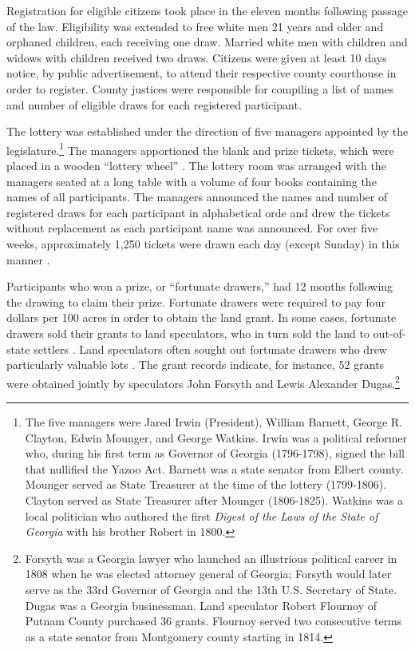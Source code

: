 Registration for eligible citizens took place in the eleven months following passage of the law. Eligibility was extended to free white men 21 years and older and orphaned children, each receiving one draw. Married white men with children and widows with children received two draws. Citizens were given at least 10 days notice, by public advertisement, to attend their respective county courthouse in order to register. County justices were responsible for compiling a list of names and number of eligible draws for each registered participant.

The lottery was established under the direction of five managers appointed by the legislature.\footnote{The five managers were Jared Irwin (President), William Barnett, George R. Clayton, Edwin Mounger, and George Watkins. Irwin was a political reformer who, during his first term as Governor of Georgia (1796-1798), signed the bill that nullified the Yazoo Act. Barnett was a state senator from Elbert county. Mounger served as State Treasurer at the time of the lottery (1799-1806). Clayton served as State Treasurer after Mounger (1806-1825). Watkins was a local politician who authored the first \textit{Digest of the Laws of the State of Georgia} with his brother Robert in 1800.} The managers apportioned the blank and prize tickets, which were placed in a wooden ``lottery wheel'' \citep{cadle1991}. The lottery room was arranged with the managers seated at a long table with a volume of four books containing the names of all participants. The managers announced the names and number of registered draws for each participant in alphabetical orde and drew the tickets without replacement as each participant name was announced. For over five weeks, approximately 1,250 tickets were drawn each day (except Sunday) in this manner \citep{graham2004}.

Participants who won a prize, or ``fortunate drawers,'' had 12 months following the drawing to claim their prize. Fortunate drawers were required to pay four dollars per 100 acres in order to obtain the land grant. In some cases, fortunate drawers sold their grants to land speculators, who in turn sold the land to out-of-state settlers \citep{davis1981}. Land speculators often sought out fortunate drawers who drew particularly valuable lots \citep{cadle1991}. The grant records indicate, for instance, 52 grants were obtained jointly by speculators John Forsyth and Lewis Alexander Dugas.\footnote{Forsyth was a Georgia lawyer who launched an illustrious political career in 1808 when he was elected attorney general of Georgia; Forsyth would later serve as the 33rd Governor of Georgia and the 13th U.S. Secretary of State. Dugas was a Georgia businessman. Land speculator Robert Flournoy of Putnam County purchased 36 grants. Flournoy served two consecutive terms as a state senator from Montgomery county starting in 1814.}

